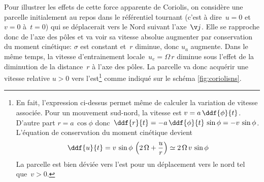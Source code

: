 \sk
Pour illustrer les effets de cette force apparente de Coriolis, on considère une parcelle initialement au repos dans le référentiel tournant (c'est à dire~$u=0$ et~$v=0$ à~$t=0$) qui se déplacerait vers le Nord suivant l'axe~$\v j$. Elle se rapproche donc de l'axe des pôles et va voir sa vitesse absolue augmenter par conservation du moment cinétique: $\sigma$ est constant et~$r$ diminue, donc $u_a$ augmente. Dans le même temps, la vitesse d'entrainement locale~$u_e=\Omega \, r$ diminue sous l'effet de la diminution de la distance~$r$ à l'axe des pôles. La parcelle va donc acquérir une vitesse relative $u>0$ vers l'est\footnote{
En fait, l'expression ci-dessus permet même de calculer la variation de vitesse associée. Pour un mouvement sud-nord, la vitesse est $v=a \, \ddf{\phi}{t}$. D'autre part $r=a \, \cos \phi$ donc~$\ddf{r}{t}=-a \, \ddf{\phi}{t} \, \sin \phi = - v \, \sin \phi$. L'équation de conservation du moment cinétique devient 
\[ \ddf{u}{t} = v \, \sin \phi \, \left( 2 \, \Omega + \frac{u}{r} \right) \simeq 2 \, \Omega \, v \, \sin \phi \] 
La parcelle est bien déviée vers l'est pour un déplacement vers le nord tel que~$v>0$.
}
comme indiqué sur le schéma \ref{fig:coriolisns}. 


